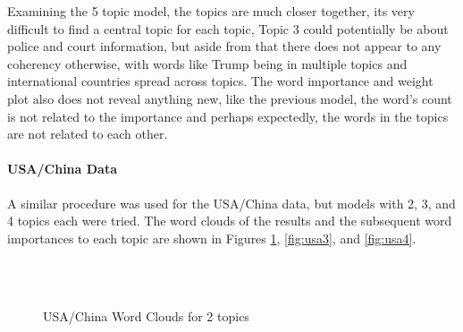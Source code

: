 Examining the 5 topic model, the topics are much closer together, its very difficult to find a central topic for each topic, Topic 3 could potentially be about police and court information, but aside from that there does not appear to any coherency otherwise, with words like Trump being in multiple topics and international countries spread across topics. The word importance and weight plot also does not reveal anything new, like the previous model, the word's count is not related to the importance and perhaps expectedly, the words in the topics are not related to each other.

\paragraph{USA/China Data}
A similar procedure was used for the USA/China data, but models with 2, 3, and 4 topics each were tried. The word clouds of the results and the subsequent word importances to each topic are shown in Figures \ref{fig:usa2}, \ref{fig:usa3}, and \ref{fig:usa4}. 
\begin{figure}[H]
	\centering
	\\
	\\
	
	\caption{USA/China Word Clouds for 2 topics}
	\label{fig:usa2}
\end{figure}
